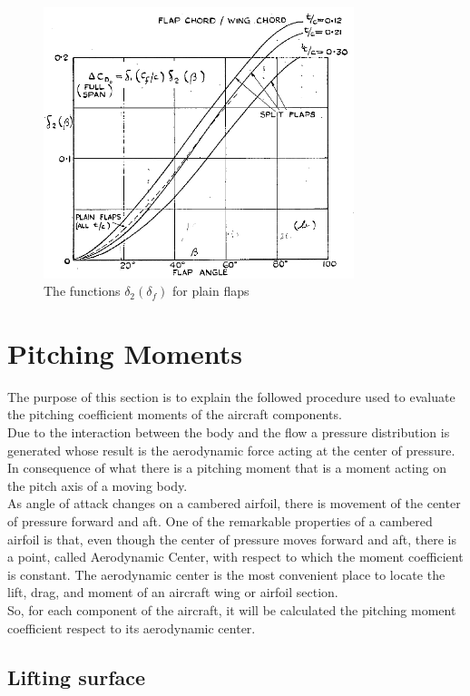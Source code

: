 \begin{figure}[H]
\centering
\includegraphics[height=7.9cm]{Immagini/Delta2_Plain}
\caption{The functions $\delta_2\left(\delta_f\right)$ for plain flaps}
\label{fig:Delta2Plain}
\end{figure}
%


\section{Pitching Moments}
The purpose of this section is to explain the followed procedure used to evaluate the pitching coefficient moments of the aircraft components.\\
Due to the interaction between the body and the flow a pressure distribution is generated whose result is the aerodynamic force acting at the center of pressure. In consequence of what there is a pitching moment that is a moment acting on the pitch axis of a moving body. \\
As angle of attack changes on a cambered airfoil, there is movement of the center of pressure forward and aft.  One of the remarkable properties of a cambered airfoil is that, even though the center of pressure moves forward and aft, there is a point, called Aerodynamic Center, with respect to which the moment coefficient is constant. The aerodynamic center is the most convenient place to locate the lift, drag, and moment of an aircraft wing or airfoil section.\\
So, for each component of the aircraft, it will be calculated the pitching moment coefficient respect to its aerodynamic center.



\subsection{Lifting surface}

